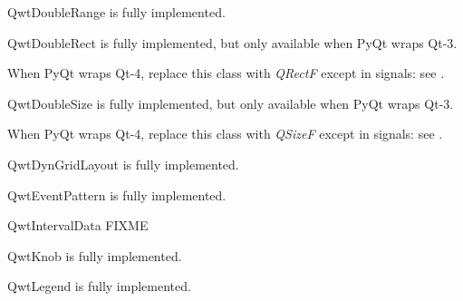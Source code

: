 \documentclass[a4paper,10pt,english]{manual}
\begin{document}
\hypertarget{PyQt4.Qwt5.QwtDoubleRange}{}\begin{classdesc}{QwtDoubleRange}{}
is fully implemented.
\end{classdesc}

\hypertarget{PyQt4.Qwt5.QwtDoubleRect}{}\begin{classdesc}{QwtDoubleRect}{}
is fully implemented, but only available when PyQt wraps Qt-3.

When PyQt wraps Qt-4, replace this class with \emph{QRectF}
except in signals: see \hyperlink{PyQt4.Qwt5.QwtDoublePoint}{}.
\end{classdesc}

\hypertarget{PyQt4.Qwt5.QwtDoubleSize}{}\begin{classdesc}{QwtDoubleSize}{}
is fully implemented, but only available when PyQt wraps Qt-3.

When PyQt wraps Qt-4, replace this class with \emph{QSizeF}
except in signals: see \hyperlink{PyQt4.Qwt5.QwtDoublePoint}{}.
\end{classdesc}

\hypertarget{PyQt4.Qwt5.QwtDynGridLayout}{}\begin{classdesc}{QwtDynGridLayout}{}
is fully implemented.
\end{classdesc}

\hypertarget{PyQt4.Qwt5.QwtEventPattern}{}\begin{classdesc}{QwtEventPattern}{}
is fully implemented.
\end{classdesc}

\hypertarget{PyQt4.Qwt5.QwtIntervalData}{}\begin{classdesc}{QwtIntervalData}{}
FIXME
\end{classdesc}

\hypertarget{PyQt4.Qwt5.QwtKnob}{}\begin{classdesc}{QwtKnob}{}
is fully implemented.
\end{classdesc}

\hypertarget{PyQt4.Qwt5.QwtLegend}{}\begin{classdesc}{QwtLegend}{}
is fully implemented.
\end{classdesc}
\end{document}
